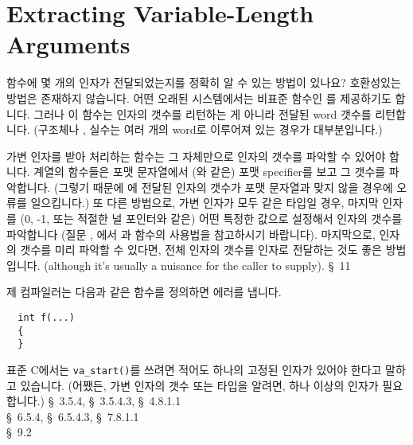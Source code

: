 \section{Extracting Variable-Length Arguments}
\begin{faq}
	함수에 몇 개의 인자가 전달되었는지를 정확히 알 수 있는 방법이
	있나요?
\A
	호환성있는 방법은 존재하지 않습니다.  어떤 오래된 시스템에서는
	비표준 함수인 를 제공하기도 합니다.  그러나
	이 함수는 인자의 갯수를 리턴하는 게 아니라 전달된 word 갯수를
	리턴합니다. (구조체나 , 실수는 여러 개의
	word로 이루어져 있는 경우가 대부분입니다.)

	가변 인자를 받아 처리하는 함수는 그 자체만으로 인자의 갯수를
	파악할 수 있어야 합니다.   계열의 함수들은 포맷 문자열에서
	(와 같은) 포맷 specifier를 보고 그 갯수를 파악합니다.
	(그렇기 때문에 에 전달된 인자의 갯수가 포맷 문자열과
	맞지 않을 경우에 오류를 일으킵니다.)
	또 다른 방법으로, 가변 인자가 모두 같은 타입일 경우, 마지막 인자를
	(0, -1, 또는 적절한 널 포인터와 같은) 어떤 특정한 값으로
	설정해서 인자의 갯수를 파악합니다 (질문 , 에서
	과  함수의 사용법을 참고하시기 바랍니다).
	마지막으로, 인자의 갯수를 미리 파악할 수 있다면, 전체 인자의 갯수를
	인자로 전달하는 것도 좋은 방법입니다.  (although it's usually a
	nuisance for the caller to supply).
\R
	\cite{pcs} \S\ 11 
\end{faq}

\begin{faq}
	제 컴파일러는 다음과 같은 함수를 정의하면 에러를 냅니다.
\begin{verbatim}
  int f(...)
  {
  }
\end{verbatim}
\A
	표준 C에서는 \verb+va_start()+를 쓰려면 적어도 하나의 고정된 인자가
	있어야 한다고 말하고 있습니다. (어쨌든, 가변 인자의 갯수 또는 타입을 알려면,
        하나 이상의 인자가 필요합니다.) 
\R
	\cite{ansi} \S\ 3.5.4, \S\ 3.5.4.3, \S\ 4.8.1.1 \\
	\cite{c89} \S\ 6.5.4, \S\ 6.5.4.3, \S\ 7.8.1.1 \\
	\cite{hs} \S\ 9.2 
\end{faq}

